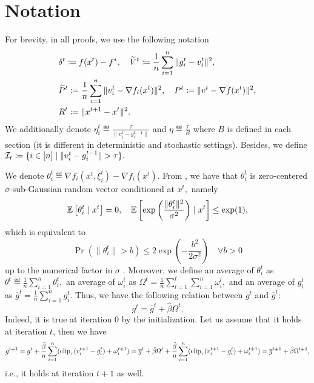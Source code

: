 \documentclass[a4paper,11pt]{article}
\begin{document}




\clearpage
\appendix



\section{Notation}

For brevity, in all proofs, we use the following notation
\begin{align*}
&\delta^t \coloneqq f(x^t) - f^*, \quad 
\widetilde{V}^t \coloneqq \frac{1}{n}\sum_{i=1}^n\|g_i^t - v_i^t\|^2,\\
&\widetilde{P}^t \coloneqq \frac{1}{n}\sum_{i=1}^n\|v_i^t - \nabla f_i(x^t)\|^2, \quad 
P^t \coloneqq \|v^t - \nabla f(x^t)\|^2,\\
&R^t \coloneqq \|x^{t+1} - x^t\|^2.
\end{align*}
We additionally denote $\eta^t_i \eqdef \frac{\tau}{\|v_i^t-g_i^{t-1}\|}$ and $\eta\eqdef \frac{\tau}{B}$ where $B$ is defined in each section (it is different in deterministic and stochastic settings). Besides, we define $\mathcal{I}_t \coloneqq \{i\in[n]\mid \|v_i^t - g_i^{t-1}\| > \tau\}.$


We denote $\theta_i^t \eqdef \nabla f_i(x^t,\xi^t_i) - \nabla f_i(x^t).$ From , we have that $\theta_i^t$ is zero-centered $\sigma$-sub-Gaussian random vector conditioned at $x^t,$ namely
\begin{equation}
\E{\theta^t_i\mid x^t} = 0, \quad \E{\exp\left(\frac{\|\theta^t_i\|^2}{\sigma^2}\right) \mid x^t} \leq \exp(1), %
\end{equation}
which is equivalent to
\begin{equation}
    \Pr(\|\theta^t_i\| > b) \le 2\exp\left(-\frac{b^2}{2\sigma^2}\right) \quad \forall b > 0 \label{eq:sub_Gaussian_alternative}
\end{equation}
up to the numerical factor in $\sigma$ \citep{vershynin2018high}. Moreover, we define an average of $\theta^t_i$ as $\theta^t \eqdef \frac{1}{n}\sum_{i=1}^n \theta^t_i,$ an average of $\omega^t_i$ as $\Omega^t = \frac{1}{n}\sum_{l=1}^t \sum_{i=1}^n\omega_i^l,$ and an average of $g_i^t$ as $\overline{g}^t = \frac{1}{n}\sum_{i=1}^n g_i^t$. Thus, we have the following relation between $g^t$ and $\overline{g}^t:$
\begin{equation}\label{eq:gt_gt_hat}
    g^t = \overline{g}^t + \hat{\beta}\Omega^t.
\end{equation}
Indeed, it is true at iteration $0$ by the initialization. Let us assume that it holds at iteration $t$, then we have
\[
    g^{t+1} = g^t + \frac{\hat{\beta}}{n}\sum_{i=1}^n (\operatorname{clip}_\tau(v_i^{t+1} - g_i^t) +\omega_i^{t+1}) = 
    \overline{g}^t 
    + \hat{\beta}\Omega^t 
    + \frac{\hat{\beta}}{n}\sum_{i=1}^n (\operatorname{clip}_\tau(v_i^{t+1} - g_i^t) +\omega_i^{t+1}) = \overline{g}^{t+1} + \hat{\beta}\Omega^{t+1},
\]
i.e., it holds at iteration $t+1$ as well. 
\end{document}
